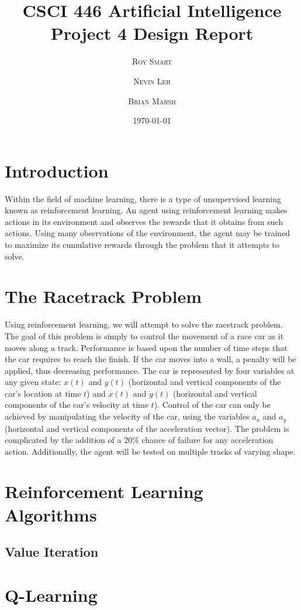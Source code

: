\documentclass{article}
\title{\vspace{-15mm}\fontsize{24pt}{10pt}\selectfont\textbf{CSCI 446 Artificial Intelligence \\[2mm] Project 4 Design Report} } %
\date{\today}
\author{
\large
\textsc{Roy Smart} \and \textsc{Nevin Leh} \and \textsc{Brian Marsh}\\[2mm] %
}
\begin{document}
	\maketitle %
	\thispagestyle{fancy} %
	\normalsize

	\section{Introduction}
		Within the field of machine learning, there is a type of unsupervised learning known as reinforcement learning.  An agent using reinforcement learning makes actions in its environment and observes the rewards that it obtains from such actions.  Using many observations of the environment, the agent may be trained to maximize its cumulative rewards through the problem that it attempts to solve.
	\section{The Racetrack Problem}
		Using reinforcement learning, we will attempt to solve the racetrack problem.  The goal of this problem is simply to control the movement of a race car as it moves along a track.  Performance is based upon the number of time steps that the car requires to reach the finish.  If the car moves into a wall, a penalty will be applied, thus decreasing performance.  The car is represented by four variables at any given state: $x(t)$ and $y(t)$ (horizontal and vertical components of the car's location at time $t$) and $\dot{x}(t)$ and $\dot{y}(t)$ (horizontal and vertical components of the car's velocity at time $t$).  Control of the car can only be achieved by manipulating the velocity of the car, using the variables $a_x$ and $a_y$ (horizontal and vertical components of the acceleration vector).  The problem is complicated by the addition of a 20\% chance of failure for any acceleration action.  Additionally, the agent will be tested on multiple tracks of varying shape.
	\section{Reinforcement Learning Algorithms}
		\subsection{Value Iteration}
	\section{Q-Learning}
\end{document}
